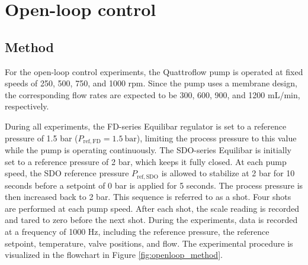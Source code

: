 \documentclass[12pt,a4paper]{article}
\begin{document}
\newpage
\section{Open-loop control}
\label{sec:open_loop}

\subsection{Method}
\label{sec:open_loop_method}
For the open-loop control experiments, the Quattroflow pump is operated at fixed speeds of 250, 500, 750, and 1000 rpm. Since the pump uses a membrane design, the corresponding flow rates are expected to be 300, 600, 900, and 1200 mL/min, respectively.  

During all experiments, the FD-series Equilibar regulator is set to a reference pressure of 1.5 bar ($P_{\mathrm{ref,FD}}=1.5~\mathrm{bar}$), limiting the process pressure to this value while the pump is operating continuously. The SDO-series Equilibar is initially set to a reference pressure of 2 bar, which keeps it fully closed. At each pump speed, the SDO reference pressure $P_{\mathrm{ref,SDO}}$ is allowed to stabilize at 2 bar for 10 seconds before a setpoint of 0 bar is applied for 5 seconds. The process pressure is then increased back to 2 bar. This sequence is referred to as a shot. Four shots are performed at each pump speed. After each shot, the scale reading is recorded and tared to zero before the next shot. During the experiments, data is recorded at a frequency of 1000 Hz, including the reference pressure, the reference setpoint, temperature, valve positions, and flow. The experimental procedure is visualized in the flowchart in Figure \ref{fig:openloop_method}.
\end{document}
